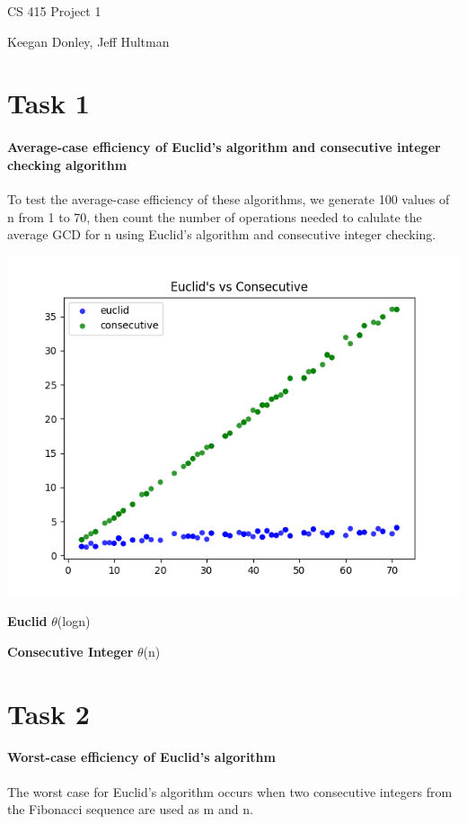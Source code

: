 \documentclass{report}
\begin{document}
	\begin{flushleft}
		\huge CS 415 Project 1
		
		\normalsize Keegan Donley, Jeff Hultman

		\section{Task 1}

		\paragraph{Average-case efficiency of Euclid's algorithm and consecutive integer checking algorithm}
		To test the average-case efficiency of these algorithms, we generate 100 values of n from 1 to 70, then count the number of
		operations needed to calulate the average GCD for n using Euclid's algorithm and consecutive integer checking.

		\includegraphics{task1}

		\textbf{Euclid} $\theta$(logn)
		
		\textbf{Consecutive Integer} $\theta$(n)

		\section{Task 2}

		\paragraph{Worst-case efficiency of Euclid's algorithm}
		The worst case for Euclid's algorithm occurs when two consecutive integers from the Fibonacci sequence are used as m and n.  


\end{flushleft}
\end{document}
